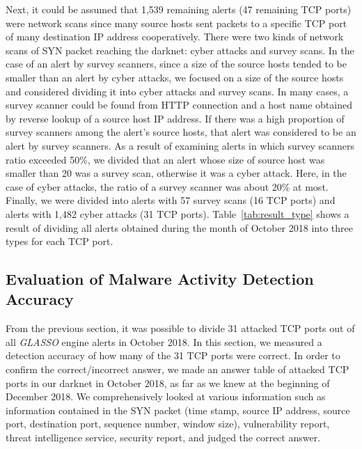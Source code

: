 \documentclass[conference]{IEEEtran}
\begin{document}
Next, it could be assumed that 1,539 remaining alerts (47 remaining TCP ports) were network scans since many source hosts sent packets to a specific TCP port of many destination IP address cooperatively.
There were two kinds of network scans of SYN packet reaching the darknet: cyber attacks and survey scans.
In the case of an alert by survey scanners, since a size of the source hosts tended to be smaller than an alert by cyber attacks, we focused on a size of the source hosts and considered dividing it into cyber attacks and survey scans.
In many cases, a survey scanner could be found from HTTP connection and a host name obtained by reverse lookup of a source host IP address.
If there was a high proportion of survey scanners among the alert's source hosts, that alert was considered to be an alert by survey scanners.
As a result of examining alerts in which survey scanners ratio exceeded 50\%, we divided that an alert whose size of source host was smaller than 20 was a survey scan, otherwise it was a cyber attack.
Here, in the case of cyber attacks, the ratio of a survey scanner was about 20\% at most.
Finally, we were divided into alerts with 57 survey scans (16 TCP ports) and alerts with 1,482 cyber attacks (31 TCP ports).
Table~\ref{tab:result_type} shows a result of dividing all alerts obtained during the month of October 2018 into three types for each TCP port.







\subsection{Evaluation of Malware Activity Detection Accuracy}
From the previous section, it was possible to divide 31 attacked TCP ports out of all {\it GLASSO} engine alerts in October 2018.
In this section, we measured a detection accuracy of how many of the 31 TCP ports were correct.
In order to confirm the correct/incorrect answer, we made an answer table of attacked TCP ports in our darknet in October 2018, as far as we knew at the beginning of December 2018.
We comprehensively looked at various information such as information contained in the SYN packet (time stamp, source IP address, source port, destination port, sequence number, window size), vulnerability report, threat intelligence service, security report, and judged the correct answer.
\end{document}

